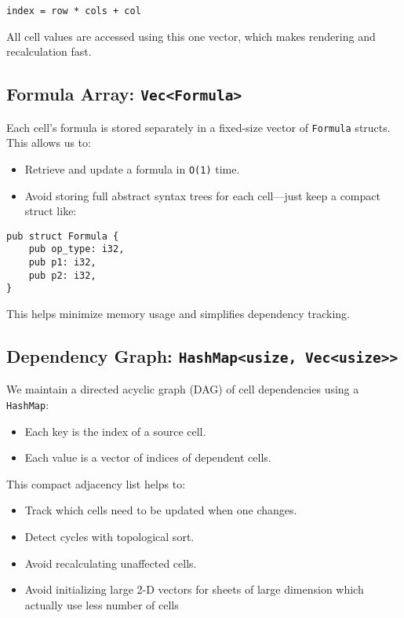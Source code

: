 \documentclass[12pt]{article}
\begin{document}
    \begin{center}
        \texttt{index = row * cols + col}
    \end{center}

    All cell values are accessed using this one vector, which makes rendering and recalculation fast.

    \subsection{Formula Array: \texttt{Vec<Formula>}}

    Each cell’s formula is stored separately in a fixed-size vector of \texttt{Formula} structs. This allows us to:
    \begin{itemize}
        \item Retrieve and update a formula in \texttt{O(1)} time.
        \item Avoid storing full abstract syntax trees for each cell—just keep a compact struct like:
    \end{itemize}

    \begin{lstlisting}
pub struct Formula {
    pub op_type: i32,
    pub p1: i32,
    pub p2: i32,
}
    \end{lstlisting}

    This helps minimize memory usage and simplifies dependency tracking.

    \subsection{Dependency Graph: \texttt{HashMap<usize, Vec<usize>>}}

    We maintain a directed acyclic graph (DAG) of cell dependencies using a \texttt{HashMap}:

    \begin{itemize}
        \item Each key is the index of a source cell.
        \item Each value is a vector of indices of dependent cells.
    \end{itemize}

    This compact adjacency list helps to:
    \begin{itemize}
        \item Track which cells need to be updated when one changes.
        \item Detect cycles with topological sort.
        \item Avoid recalculating unaffected cells.
        \item Avoid initializing large 2-D vectors for sheets of large dimension which actually use less number of cells
        \
    \end{itemize}
\end{document}
